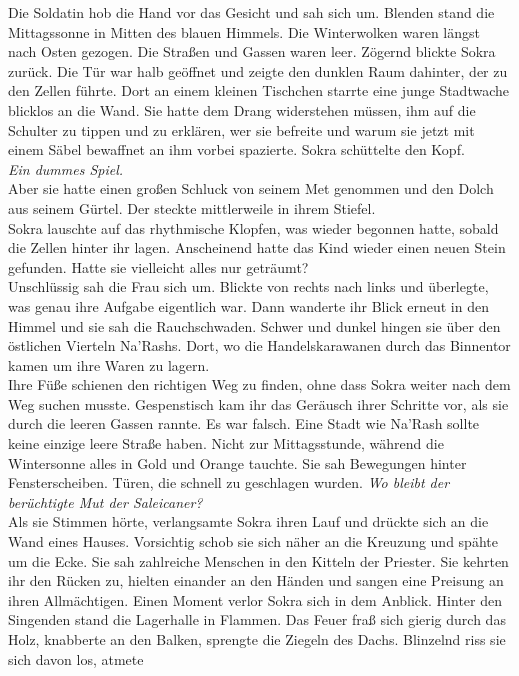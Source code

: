 Die Soldatin hob die Hand vor das Gesicht und sah sich um. Blenden stand die Mittagssonne in Mitten 
des blauen Himmels. Die Winterwolken waren längst nach Osten gezogen. Die Straßen und Gassen waren leer. Zögernd blickte Sokra zurück. Die Tür war 
halb geöffnet und zeigte den dunklen Raum dahinter, der zu den Zellen führte. Dort an einem kleinen 
Tischchen starrte eine junge Stadtwache blicklos an die Wand. Sie hatte dem Drang widerstehen 
müssen, ihm auf die Schulter zu tippen und zu erklären, wer sie befreite und warum sie jetzt mit 
einem Säbel bewaffnet an ihm vorbei spazierte. Sokra schüttelte den Kopf.\\
\textit{Ein dummes Spiel.}\\
Aber sie hatte einen großen Schluck von seinem Met genommen und den Dolch aus seinem Gürtel. Der 
steckte mittlerweile in ihrem Stiefel.\\
Sokra lauschte auf das rhythmische Klopfen, was wieder begonnen hatte, sobald die Zellen hinter ihr 
lagen. Anscheinend hatte das Kind wieder einen neuen Stein gefunden. Hatte sie vielleicht alles nur 
geträumt?\\
Unschlüssig sah die Frau sich um. Blickte von rechts nach links und überlegte, was genau ihre 
Aufgabe eigentlich war. Dann wanderte ihr Blick erneut in den Himmel und sie sah die Rauchschwaden. 
Schwer und dunkel hingen sie über den östlichen Vierteln Na'Rashs. Dort, wo die Handelskarawanen 
durch das Binnentor kamen um ihre Waren zu lagern.\\
Ihre Füße schienen den richtigen Weg zu finden, ohne dass Sokra weiter nach dem Weg suchen musste. 
Gespenstisch kam ihr das Geräusch ihrer Schritte vor, als sie durch die leeren Gassen rannte. Es 
war falsch. Eine Stadt wie Na'Rash sollte keine einzige leere Straße haben. Nicht zur 
Mittagsstunde, während die Wintersonne alles in Gold und Orange tauchte. Sie sah Bewegungen hinter 
Fensterscheiben. Türen, die schnell zu geschlagen wurden. \textit{Wo bleibt der berüchtigte Mut der 
Saleicaner?}\\
Als sie Stimmen hörte, verlangsamte Sokra ihren Lauf und drückte sich an die Wand eines Hauses. 
Vorsichtig schob sie sich näher an die Kreuzung und spähte um die Ecke. Sie sah zahlreiche Menschen 
in den Kitteln der Priester. Sie kehrten ihr den Rücken zu, hielten einander an den Händen und 
sangen eine Preisung an ihren Allmächtigen. Einen Moment verlor Sokra sich in dem Anblick. Hinter 
den Singenden stand die Lagerhalle in Flammen. Das Feuer fraß sich gierig durch das Holz, knabberte 
an den Balken, sprengte die Ziegeln des Dachs. Blinzelnd riss sie sich davon los, atmete 
